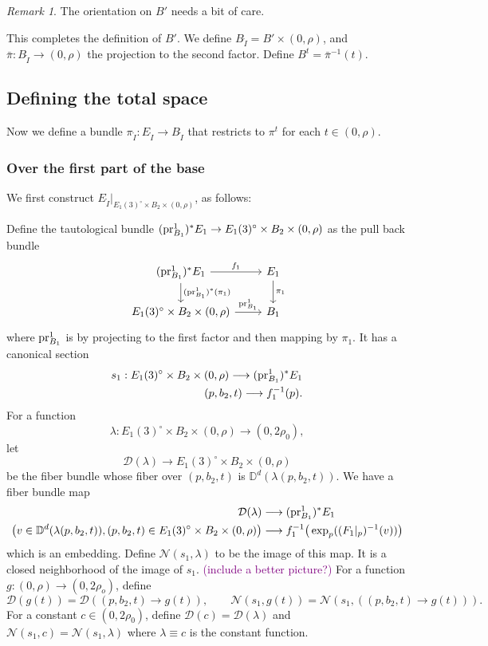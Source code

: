 \documentclass[11pt]{article}
\theoremstyle{definition}
\theoremstyle{remark}
\newtheorem{rmk}[thm]{Remark}
\def\D{\mathbb{D}}
\def\cN{\mathcal{N}}
\def\rI{{\mathring{I}}}
\def\cmt#1{\textcolor{purple}{(#1)}}
\def\pr{{\textnormal{pr}}}
\begin{document}
\begin{rmk}
The orientation on $B'$ needs a bit of care. 
\end{rmk}


This completes the definition of $B'$. 
We define $B_\rI=B'\times (0,\rho)$, and $\bar\pi:B_{\rI}\to(0,\rho)$ the projection to the second factor. Define $B^t=\bar\pi^{-1}(t)$. 


\subsection{Defining the total space}
\label{EI_subsec}
Now we define a bundle $\pi_\rI:E_\rI\to B_\rI$ that restricts to $\pi^t$ for each $t\in(0,\rho)$. 

\subsubsection{Over the first part of the base}
\label{first_subsubsec}
We first construct $E_\rI|_{E_1(3)^\circ\times B_2\times (0,\rho)}$, as follows: 

Define the tautological bundle $(\pr^1_{B_1})^*E_1\to E_1(3)^\circ\times B_2\times (0,\rho)$ as the pull back bundle
\[\begin{tikzcd}
(\pr^1_{B_1})^*E_1\rar["f_1"]\dar["(\pr^1_{B_1})^*(\pi_1)"] & E_1\dar["\pi_1"] \\
E_1(3)^\circ\times B_2\times (0,\rho)\rar["\pr^1_{B_1}"] & B_1
\end{tikzcd}\]
where $\pr^1_{B_1}$ is by projecting to the first factor and then mapping by $\pi_1$. 
It has a canonical section 
\begin{align*}
s_1: E_1(3)^\circ\times B_2\times (0,\rho)\longrightarrow (\pr^1_{B_1})^*E_1\\
(p,b_2,t)\longrightarrow f^{-1}_1(p).
\end{align*}
For a function 
$$\lambda:E_1(3)^\circ\times B_2\times (0,\rho)\longrightarrow(0,2\rho_0),$$
let 
$$\mathcal{D}(\lambda)\longrightarrow E_1(3)^\circ\times B_2\times (0,\rho)$$ 
be the fiber bundle whose fiber over $(p,b_2,t)$ is $\D^d(\lambda(p,b_2,t))$. 
We have a fiber bundle map 
\begin{align}\label{exp1_eqn}
\mathcal{D}(\lambda)&\longrightarrow (\pr^1_{B_1})^*E_1\\
\big(v\in \D^d(\lambda(p,b_2,t)),(p,b_2,t)\in E_1(3)^\circ\times B_2\times(0,\rho)\big)&\longrightarrow f_1^{-1}\big(\exp_p((F_1|_p)^{-1}(v))\big)\nonumber
\end{align}
which is an embedding. 
Define
$\mathcal{N}(s_1,\lambda)$ to be the image of this map. 
It is a closed neighborhood of the image of $s_1$. 
\cmt{include a better picture?}
For a function $g:(0,\rho)\to(0,2\rho_o)$, define $$\mathcal{D}(g(t))=\mathcal{D}((p,b_2,t)\to g(t)),\qquad\cN(s_1,g(t))=\cN(s_1,((p,b_2,t)\to g(t))).$$
For a constant $c\in(0,2\rho_0)$, define 
$\mathcal{D}(c)=\mathcal{D}(\lambda)$ and $\cN(s_1,c)=\cN(s_1,\lambda)$ where $\lambda\equiv c$ is the constant function. 
\end{document}
